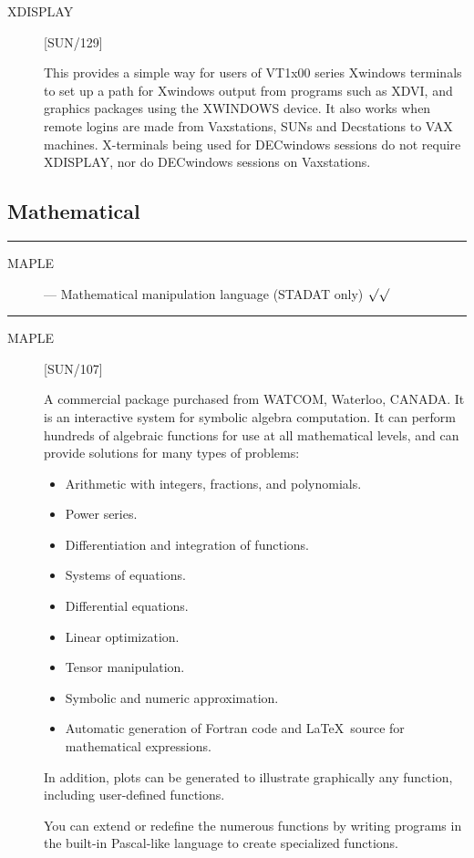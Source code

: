 \begin{description}
\item [XDISPLAY] \hfill [SUN/129]

This provides a simple way for users of VT1x00 series Xwindows terminals to
set up a path for Xwindows output from programs such as XDVI, and graphics
packages using the XWINDOWS device.
It also works when remote logins are made from Vaxstations, SUNs and
Decstations to VAX machines.
X-terminals being used for DECwindows sessions do not require XDISPLAY, nor do 
DECwindows sessions on Vaxstations.

\end{description}

\newpage

\subsection{Mathematical}

\rule{\textwidth}{0.5mm}
\begin{description}
\begin{description}
\item [MAPLE] --- Mathematical manipulation language (STADAT only) \hfill
 $\surd\surd$
\end{description}
\end{description}
\rule{\textwidth}{0.5mm}

\begin{description}

\item [MAPLE] \hfill [SUN/107]

A commercial package purchased from WATCOM, Waterloo, CANADA.
It is an interactive system for symbolic algebra computation.
It can perform hundreds of algebraic functions for use at all mathematical
levels, and can provide solutions for many types of problems:
\begin{itemize}
\item Arithmetic with integers, fractions, and polynomials.
\item Power series.
\item Differentiation and integration of functions.
\item Systems of equations.
\item Differential equations.
\item Linear optimization.
\item Tensor manipulation.
\item Symbolic and numeric approximation.
\item Automatic generation of Fortran code and \LaTeX\ source for mathematical
expressions.
\end{itemize}
In addition, plots can be generated to illustrate graphically any function,
including user-defined functions.

You can extend or redefine the numerous functions by writing programs in
the built-in Pascal-like language to create specialized functions.

\end{description}

